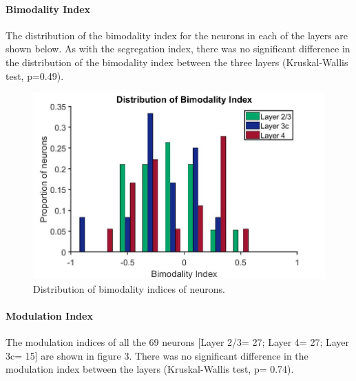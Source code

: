 	\paragraph{Bimodality Index}
	
	The distribution of the bimodality index for the neurons in each of the layers are shown below. As with the segregation index, there was no significant difference in the distribution of the bimodality index between the three layers (Kruskal-Wallis test, p=0.49).
	
	\begin{figure}[H]
		
		\includegraphics[width=\linewidth]{LinearV1/Biindex.jpg}
		\caption{Distribution of bimodality indices of neurons.}
		\label{fig:bi}
	\end{figure}

	\paragraph{Modulation Index}
	The modulation indices of all the 69 neurons [Layer 2/3= 27; Layer 4= 27; Layer 3c= 15] are shown in figure 3. There was no significant difference in the modulation index between the layers (Kruskal-Wallis test, p= 0.74).
	
